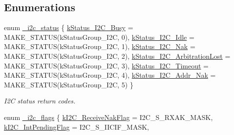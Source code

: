 \subsection*{Enumerations}
\begin{DoxyCompactItemize}
\item 
enum \mbox{\hyperlink{group__i2c__driver_ga7cc91c89125c25a88e463a9e8550b284}{\+\_\+i2c\+\_\+status}} \{ \newline
\mbox{\hyperlink{group__i2c__driver_gga7cc91c89125c25a88e463a9e8550b284a49091894b590d7e479605bf113918952}{k\+Status\+\_\+\+I2\+C\+\_\+\+Busy}} = M\+A\+K\+E\+\_\+\+S\+T\+A\+T\+US(k\+Status\+Group\+\_\+\+I2C, 0), 
\mbox{\hyperlink{group__i2c__driver_gga7cc91c89125c25a88e463a9e8550b284a628d242f7bc0e3d5949c7f73eafaa508}{k\+Status\+\_\+\+I2\+C\+\_\+\+Idle}} = M\+A\+K\+E\+\_\+\+S\+T\+A\+T\+US(k\+Status\+Group\+\_\+\+I2C, 1), 
\mbox{\hyperlink{group__i2c__driver_gga7cc91c89125c25a88e463a9e8550b284a72fd33d0b5263a63766e62f71d16be00}{k\+Status\+\_\+\+I2\+C\+\_\+\+Nak}} = M\+A\+K\+E\+\_\+\+S\+T\+A\+T\+US(k\+Status\+Group\+\_\+\+I2C, 2), 
\mbox{\hyperlink{group__i2c__driver_gga7cc91c89125c25a88e463a9e8550b284a139b52cc3305ec2c06d0ac94313c221f}{k\+Status\+\_\+\+I2\+C\+\_\+\+Arbitration\+Lost}} = M\+A\+K\+E\+\_\+\+S\+T\+A\+T\+US(k\+Status\+Group\+\_\+\+I2C, 3), 
\newline
\mbox{\hyperlink{group__i2c__driver_gga7cc91c89125c25a88e463a9e8550b284a81ad7cc198436cabbe91ea55c5288747}{k\+Status\+\_\+\+I2\+C\+\_\+\+Timeout}} = M\+A\+K\+E\+\_\+\+S\+T\+A\+T\+US(k\+Status\+Group\+\_\+\+I2C, 4), 
\mbox{\hyperlink{group__i2c__driver_gga7cc91c89125c25a88e463a9e8550b284adf7437bfedcc0d57338ed33f1be5c805}{k\+Status\+\_\+\+I2\+C\+\_\+\+Addr\+\_\+\+Nak}} = M\+A\+K\+E\+\_\+\+S\+T\+A\+T\+US(k\+Status\+Group\+\_\+\+I2C, 5)
 \}
\begin{DoxyCompactList}\small\item\em I2C status return codes. \end{DoxyCompactList}\item 
enum \mbox{\hyperlink{group__i2c__driver_ga1f1337bbe9d0b184d9dcee31f9ebade2}{\+\_\+i2c\+\_\+flags}} \{ \newline
\mbox{\hyperlink{group__i2c__driver_gga1f1337bbe9d0b184d9dcee31f9ebade2a4c3c2928e17ddbfbc1c346c6b9a8dccd}{k\+I2\+C\+\_\+\+Receive\+Nak\+Flag}} = I2\+C\+\_\+\+S\+\_\+\+R\+X\+A\+K\+\_\+\+M\+A\+SK, 
\mbox{\hyperlink{group__i2c__driver_gga1f1337bbe9d0b184d9dcee31f9ebade2a647d0b1d1f9514ad483bef3ea3926c3b}{k\+I2\+C\+\_\+\+Int\+Pending\+Flag}} = I2\+C\+\_\+\+S\+\_\+\+I\+I\+C\+I\+F\+\_\+\+M\+A\+SK, 

\end{DoxyCompactItemize}
